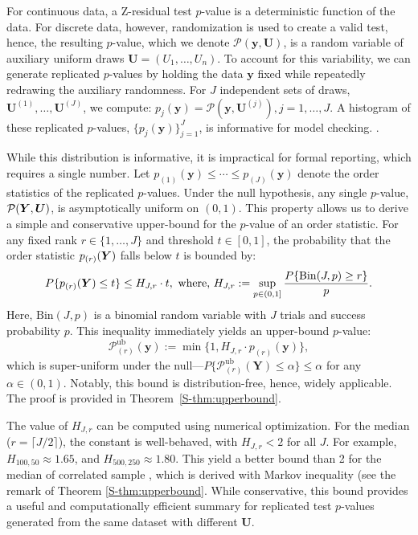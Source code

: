 For continuous data, a Z-residual test $p$-value is a deterministic function of the data. For discrete data, however, randomization is used to create a valid test, hence, the resulting $p$-value, which we denote $\mathcal{P}(\bm{y},\bm{U})$, is a random variable of auxiliary uniform draws $\bm{U} = (U_1, \dots, U_n)$. To account for this variability, we can generate replicated $p$-values by holding the data $\bm{y}$ fixed while repeatedly redrawing the auxiliary randomness. For $J$ independent sets of draws, $\bm{U}^{(1)},\ldots,\bm{U}^{(J)}$, we compute:
$p_j(\bm{y}) = \mathcal{P}(\bm{y},\bm{U}^{(j)}), j=1,\ldots,J.$
A histogram of these replicated $p$-values, $\{p_j(\bm{y})\}_{j=1}^J$, is informative for model checking. .

While this distribution is informative, it is impractical for formal reporting, which requires a single number. Let $p_{(1)}(\bm{y})\le \cdots \le p_{(J)}(\bm{y})$ denote the order statistics of the replicated $p$-values. Under the null hypothesis, any single $p$-value, $\mathcal{P}(\bm{Y},\bm{U})$, is asymptotically uniform on $(0,1)$. This property allows us to derive a simple and conservative upper-bound for the $p$-value of an order statistic. For any fixed rank $r\in\{1,\ldots,J\}$ and threshold $t\in[0,1]$, the probability that the order statistic $p_{(r)}(\bm{Y})$ falls below $t$ is bounded by:
\begin{equation}\label{eq:HJr_main}
P\{p_{(r)}(\bm{Y}) \le t\} \le H_{J,r} \cdot t,
\text{ where, }
H_{J,r} := \sup_{p\in(0,1]}\frac{P\{\mathrm{Bin}(J,p)\ge r\}}{p}.
\end{equation}
Here, $\mathrm{Bin}(J,p)$ is a binomial random variable with $J$ trials and success probability $p$. This inequality immediately yields an upper-bound $p$-value:
\begin{equation}
\mathcal{P}_{(r)}^{\mathrm{ub}}(\bm{y}) := \min\{1, H_{J,r} \cdot p_{(r)}(\bm{y})\}, \label{eqn:uppvalue-median}
\end{equation}
which is super-uniform under the null---$P\{\mathcal{P}_{(r)}^{\mathrm{ub}}(\bm{Y}) \le \alpha\} \le \alpha$ for any $\alpha \in (0,1)$. Notably, this bound is distribution-free, hence, widely applicable. The proof is provided in Theorem~\ref{S-thm:upperbound}.

The value of $H_{J,r}$ can be computed using numerical optimization. For the median ($r=\lceil J/2\rceil$), the constant is well-behaved, with $H_{J,r}<2$ for all $J$. For example, $H_{100,50}\approx 1.65$, and $H_{500,250}\approx 1.80$. This yield a better bound than 2 for the median of correlated sample \citep{johnson_bayesian_2007, yuan_goodness--fit_2012}, which is derived with Markov inequality (see the remark of Theorem \ref{S-thm:upperbound}. While conservative, this bound provides a useful and computationally efficient summary for replicated test $p$-values generated from the same dataset with different  $\bm{U}$.

